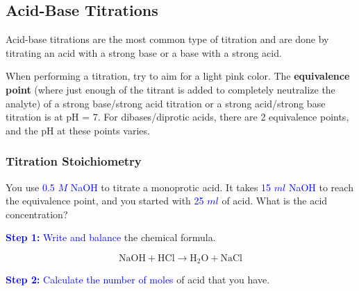 \documentclass[a4paper, 12pt]{article}
\begin{document}
\subsection{Acid-Base Titrations}
Acid-base titrations are the most common type of titration and are done by titrating an acid with a strong base or a base with a strong acid.

\begin{center}
\end{center}

When performing a titration, try to aim for a light pink color. The \textbf{equivalence point} (where just enough of the titrant is added to completely neutralize the analyte) of a strong base/strong acid titration or a strong acid/strong base titration is at pH = 7. For dibases/diprotic acids, there are 2 equivalence points, and the pH at these points varies.

\subsubsection{Titration Stoichiometry}
You use \textcolor{blue}{0.5 $M$ NaOH} to titrate a monoprotic acid. It takes \textcolor{blue}{15 $ml$ NaOH} to reach the equivalence point, and you started with \textcolor{blue}{25 $ml$} of acid. What is the acid concentration?

\textcolor{blue}{\textbf{Step 1:} Write and balance} the chemical formula.

$$\text{NaOH} + \text{HCl} \longrightarrow \text{H$_2$O} + \text{NaCl}$$

\textcolor{blue}{\textbf{Step 2:} Calculate the number of moles} of acid that you have.
\end{document}
